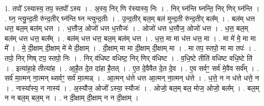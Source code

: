 \documentclass[17pt]{extarticle}
\begin{document}
1. तपो᳚ ऽस्यास्य॒ तप॒ स्तपो᳚ ऽस्य । . अ॒स्य॒ निर् णि र॑स्यास्य॒ निः । . निर् घ्न॑न्ति घ्नन्ति॒ निर् णिर् घ्न॑न्ति । . घ्न॒ न्त्यु॒न्द॒ती रु॑न्द॒तीर् घ्न॑न्ति घ्न न्त्युन्द॒तीः । . उ॒न्द॒तीर् बल॒म् बल॑ मुन्द॒ती रु॑न्द॒तीर् बल᳚म् । . बल॑म् धत्त धत्त॒ बल॒म् बल॑म् धत्त । . ध॒त्तौज॒ ओजो॑ धत्त ध॒त्तौजः॑ । . ओजो॑ धत्त ध॒त्तौज॒ ओजो॑ धत्त । . ध॒त्त॒ बल॒म् बल॑म् धत्त धत्त॒ बल᳚म् । . बल॑म् धत्त धत्त॒ बल॒म् बल॑म् धत्त । . ध॒त्त॒ मा मा ध॑त्त धत्त॒ मा । . मा मे॑ मे॒ मा मा मे᳚ । . मे॒ दी॒क्षाम् दी॒क्षाम् मे॑ मे दी॒क्षाम् । . दी॒क्षाम् मा मा दी॒क्षाम् दी॒क्षाम् मा । . मा तप॒ स्तपो॒ मा मा तपः॑ । . तपो॒ निर् णिष् टप॒ स्तपो॒ निः । . निर् व॑धिष्ट वधिष्ट॒ निर् णिर् व॑धिष्ट । . व॒धि॒ष्टे तीति॑ वधिष्ट वधि॒ष्टे ति॑ । . इत्या॑हा॒हे तीत्या॑ह । . आ॒है॒त दे॒त दा॑हा है॒तत् । . ए॒त दे॒वैवैत दे॒त दे॒व । . ए॒व सर्वꣳ॒॒ सर्व॑ मे॒वैव सर्व᳚म् । . सर्व॑ मा॒त्मन् ना॒त्मन् थ्सर्वꣳ॒॒ सर्व॑ मा॒त्मन्न् । . आ॒त्मन् ध॑त्ते धत्त आ॒त्मन् ना॒त्मन् ध॑त्ते । . ध॒त्ते॒ न न ध॑त्ते धत्ते॒ न । . नास्या᳚स्य॒ न नास्य॑ । . अ॒स्यौज॒ ओजो᳚ ऽस्या॒ स्यौजः॑ । . ओजो॒ बल॒म् बल॒ मोज॒ ओजो॒ बल᳚म् । . बल॒म् न न बल॒म् बल॒म् न । . न दी॒क्षाम् दी॒क्षाम् न न दी॒क्षाम् । \newline
\end{document}
